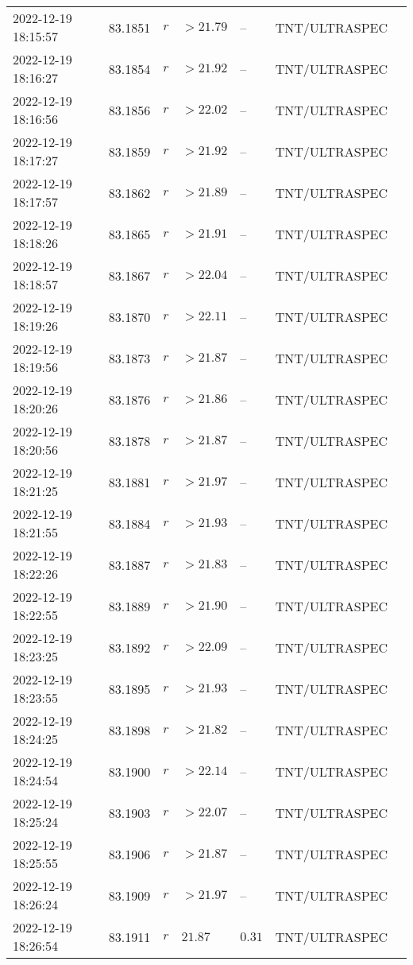 \documentclass{nature_plusfigure}
\begin{document}
\begin{supplement}
\begin{center}
\begin{longtable}{lllllll}
2022-12-19 18:15:57 & 83.1851 & $r$ & $>21.79$ & -- & TNT/ULTRASPEC &  \\ 
2022-12-19 18:16:27 & 83.1854 & $r$ & $>21.92$ & -- & TNT/ULTRASPEC &  \\ 
2022-12-19 18:16:56 & 83.1856 & $r$ & $>22.02$ & -- & TNT/ULTRASPEC &  \\ 
2022-12-19 18:17:27 & 83.1859 & $r$ & $>21.92$ & -- & TNT/ULTRASPEC &  \\ 
2022-12-19 18:17:57 & 83.1862 & $r$ & $>21.89$ & -- & TNT/ULTRASPEC &  \\ 
2022-12-19 18:18:26 & 83.1865 & $r$ & $>21.91$ & -- & TNT/ULTRASPEC &  \\ 
2022-12-19 18:18:57 & 83.1867 & $r$ & $>22.04$ & -- & TNT/ULTRASPEC &  \\ 
2022-12-19 18:19:26 & 83.1870 & $r$ & $>22.11$ & -- & TNT/ULTRASPEC &  \\ 
2022-12-19 18:19:56 & 83.1873 & $r$ & $>21.87$ & -- & TNT/ULTRASPEC &  \\ 
2022-12-19 18:20:26 & 83.1876 & $r$ & $>21.86$ & -- & TNT/ULTRASPEC &  \\ 
2022-12-19 18:20:56 & 83.1878 & $r$ & $>21.87$ & -- & TNT/ULTRASPEC &  \\ 
2022-12-19 18:21:25 & 83.1881 & $r$ & $>21.97$ & -- & TNT/ULTRASPEC &  \\ 
2022-12-19 18:21:55 & 83.1884 & $r$ & $>21.93$ & -- & TNT/ULTRASPEC &  \\ 
2022-12-19 18:22:26 & 83.1887 & $r$ & $>21.83$ & -- & TNT/ULTRASPEC &  \\ 
2022-12-19 18:22:55 & 83.1889 & $r$ & $>21.90$ & -- & TNT/ULTRASPEC &  \\ 
2022-12-19 18:23:25 & 83.1892 & $r$ & $>22.09$ & -- & TNT/ULTRASPEC &  \\ 
2022-12-19 18:23:55 & 83.1895 & $r$ & $>21.93$ & -- & TNT/ULTRASPEC &  \\ 
2022-12-19 18:24:25 & 83.1898 & $r$ & $>21.82$ & -- & TNT/ULTRASPEC &  \\ 
2022-12-19 18:24:54 & 83.1900 & $r$ & $>22.14$ & -- & TNT/ULTRASPEC &  \\ 
2022-12-19 18:25:24 & 83.1903 & $r$ & $>22.07$ & -- & TNT/ULTRASPEC &  \\ 
2022-12-19 18:25:55 & 83.1906 & $r$ & $>21.87$ & -- & TNT/ULTRASPEC &  \\ 
2022-12-19 18:26:24 & 83.1909 & $r$ & $>21.97$ & -- & TNT/ULTRASPEC &  \\ 
2022-12-19 18:26:54 & 83.1911 & $r$ & $21.87$ & $0.31$ & TNT/ULTRASPEC &  \\ 

\end{longtable}
\end{center}
\end{supplement}
\end{document}
